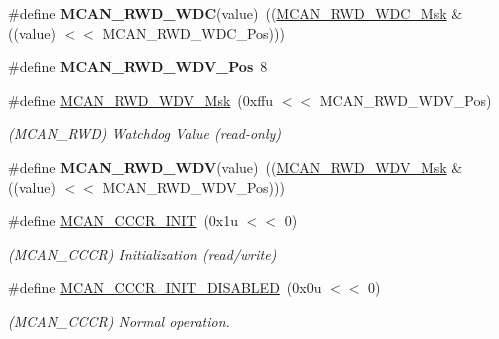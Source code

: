 \begin{DoxyCompactItemize}
\#define {\bfseries M\+C\+A\+N\+\_\+\+R\+W\+D\+\_\+\+W\+DC}(value)~((\mbox{\hyperlink{group__SAMV71__MCAN_ga93fcc958bc3c793a45a2cf68687dd312}{M\+C\+A\+N\+\_\+\+R\+W\+D\+\_\+\+W\+D\+C\+\_\+\+Msk}} \& ((value) $<$$<$ M\+C\+A\+N\+\_\+\+R\+W\+D\+\_\+\+W\+D\+C\+\_\+\+Pos)))
\item 
\mbox{\label{group__SAME70__MCAN_ga1edb34787ed9fb4270382611c740a726}} 
\#define {\bfseries M\+C\+A\+N\+\_\+\+R\+W\+D\+\_\+\+W\+D\+V\+\_\+\+Pos}~8
\item 
\mbox{\label{group__SAME70__MCAN_gad8dc32b4087ccb131dccc05ba1871cdc}} 
\#define \mbox{\hyperlink{group__SAME70__MCAN_gad8dc32b4087ccb131dccc05ba1871cdc}{M\+C\+A\+N\+\_\+\+R\+W\+D\+\_\+\+W\+D\+V\+\_\+\+Msk}}~(0xffu $<$$<$ M\+C\+A\+N\+\_\+\+R\+W\+D\+\_\+\+W\+D\+V\+\_\+\+Pos)
\begin{DoxyCompactList}\small\item\em (M\+C\+A\+N\+\_\+\+R\+WD) Watchdog Value (read-\/only) \end{DoxyCompactList}\item 
\mbox{\label{group__SAME70__MCAN_gaff0e65ce33dacb630b2a0632570ee680}} 
\#define {\bfseries M\+C\+A\+N\+\_\+\+R\+W\+D\+\_\+\+W\+DV}(value)~((\mbox{\hyperlink{group__SAMV71__MCAN_gad8dc32b4087ccb131dccc05ba1871cdc}{M\+C\+A\+N\+\_\+\+R\+W\+D\+\_\+\+W\+D\+V\+\_\+\+Msk}} \& ((value) $<$$<$ M\+C\+A\+N\+\_\+\+R\+W\+D\+\_\+\+W\+D\+V\+\_\+\+Pos)))
\item 
\mbox{\label{group__SAME70__MCAN_ga2d679ba6d4d15b01aae325f11eb9195c}} 
\#define \mbox{\hyperlink{group__SAME70__MCAN_ga2d679ba6d4d15b01aae325f11eb9195c}{M\+C\+A\+N\+\_\+\+C\+C\+C\+R\+\_\+\+I\+N\+IT}}~(0x1u $<$$<$ 0)
\begin{DoxyCompactList}\small\item\em (M\+C\+A\+N\+\_\+\+C\+C\+CR) Initialization (read/write) \end{DoxyCompactList}\item 
\mbox{\label{group__SAME70__MCAN_ga7ce474e5e7280616baeb266f7d2c509e}} 
\#define \mbox{\hyperlink{group__SAME70__MCAN_ga7ce474e5e7280616baeb266f7d2c509e}{M\+C\+A\+N\+\_\+\+C\+C\+C\+R\+\_\+\+I\+N\+I\+T\+\_\+\+D\+I\+S\+A\+B\+L\+ED}}~(0x0u $<$$<$ 0)
\begin{DoxyCompactList}\small\item\em (M\+C\+A\+N\+\_\+\+C\+C\+CR) Normal operation. \end{DoxyCompactList}\item 
$$
\end{DoxyCompactItemize}
